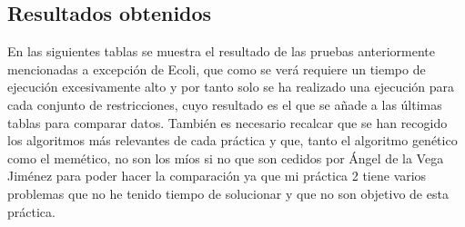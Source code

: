 \documentclass{article}
\begin{document}
	\subsection{Resultados obtenidos}
	En las siguientes tablas se muestra el resultado de las pruebas anteriormente mencionadas a excepción de Ecoli, que como se verá requiere un tiempo de ejecución excesivamente alto y por tanto solo se ha realizado una ejecución para cada conjunto de restricciones, cuyo resultado es el que se añade a las últimas tablas para comparar datos. También es necesario recalcar que se han recogido los algoritmos más relevantes de cada práctica y que, tanto el algoritmo genético como el memético, no son los míos si no que son cedidos por Ángel de la Vega Jiménez para poder hacer la comparación ya que mi práctica 2 tiene varios problemas que no he tenido tiempo de solucionar y que no son objetivo de esta práctica.
\end{document}
